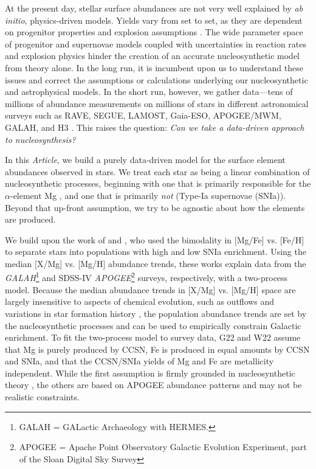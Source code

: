 \documentclass[modern]{aastex631}
\newcommand{\documentname}{\textsl{Article}}
\begin{document}
At the present day, stellar surface abundances are not very well explained by \textsl{ab initio}, physics-driven models.
Yields vary from set to set, as they are dependent on progenitor properties and explosion assumptions \citep[e.g.,][]{rybizki2017, griffith2021b}. 
The wide parameter space of progenitor and supernovae models coupled with uncertainties in reaction rates and explosion physics hinder the creation of an accurate nucleosynthetic model from theory alone.
In the long run, it is incumbent upon us to understand these issues and correct the assumptions or calculations underlying our nucleosynthetic and astrophysical models.
In the short run, however, we gather data---tens of millions of abundance measurements on millions of stars in different astronomical surveys such as RAVE, SEGUE, LAMOST, Gaia-ESO, APOGEE/MWM, GALAH, and H3 \citep{steinmetz2006, yanny2009, gilmore2012, desilva2015, luo2015, majewski2017, conroy2019}.
This raises the question: \emph{Can we take a data-driven approach to nucleosynthesis?}

In this \documentname{}, we build a purely data-driven model for the surface element abundances observed in stars.
We treat each star as being a linear combination of nucleosynthetic processes, beginning with one that is primarily responsible for the $\alpha$-element Mg \citep[core collapse supernovae (CCSN), e.g.][]{andrews2017}, and one that is primarily \emph{not} (Type-Ia supernovae (SNIa)).
Beyond that up-front assumption, we try to be agnostic about how the elements are produced.

We build upon the work of \citet[][hereafter G22]{griffith2019, griffith2022} and \citet[][hereafter W22]{weinberg2019, weinberg2022}, who used the bimodality in [Mg/Fe] vs. [Fe/H] \citep[e.g.,][]{fuhrmann1998, bensby2003, adibekyan2012} to separate stars into populations with high and low SNIa enrichment. Using the median [X/Mg] vs. [Mg/H] abundance trends, these works explain data from the \textsl{GALAH}\footnote{GALAH = GALactic Archaeology with HERMES.} and SDSS-IV \textsl{APOGEE}\footnote{APOGEE = Apache Point Observatory Galactic Evolution Experiment, part of the Sloan Digital Sky Survey} surveys, respectively, with a two-process model. Because the median abundance trends in [X/Mg] vs. [Mg/H] space are largely insensitive to aspects of chemical evolution, such as outflows and variations in star formation history \citep{weinberg2019}, the population abundance trends are set by the nucleosynthetic processes and can be used to empirically constrain Galactic enrichment. To fit the two-process model to survey data, G22 and W22 assume that Mg is purely produced by CCSN, Fe is produced in equal amounts by CCSN and SNIa, and that the CCSN/SNIa yields of Mg and Fe are metallicity independent. While the first assumption is firmly grounded in nucleosynthetic theory \citep[e.g.,][]{andrews2017, rybizki2017}, the others are based on APOGEE abundance patterns and may not be realistic constraints.
\end{document}
